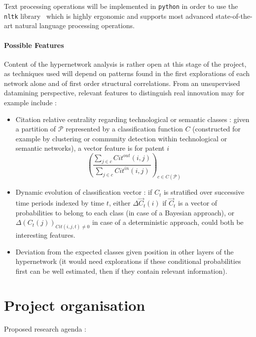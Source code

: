 Text processing operations will be implemented in \texttt{python} in order to use the \texttt{nltk} library~\cite{nltk} which is highly ergonomic and supports most advanced state-of-the-art natural language processing operations.


\paragraph{Possible Features}

Content of the hypernetwork analysis is rather open at this stage of the project, as techniques used will depend on patterns found in the first explorations of each network alone and of first order structural correlations. From an unsupervised datamining perspective, relevant features to distinguish real innovation may for example include :
\begin{itemize}
\item Citation relative centrality regarding technological or semantic classes : given a partition of $\mathcal{P}$ represented by a classification function $C$ (constructed for example by clustering or community detection within technological or semantic networks), a vector feature is for patent $i$
\[
\left(\frac{\sum_{j\in c}Cit^{out}(i,j)}{\sum_{j\in c}Cit^{in}(i,j)}\right)_{c\in C(\mathcal{P})}
\]
\item Dynamic evolution of classification vector : if $C_t$ is stratified over successive time periods indexed by time $t$, either $\Delta \vec{C}_t (i)$ if $\vec{C}_t$ is a vector of probabilities to belong to each class (in case of a Bayesian approach), or $\Delta (C_t(j))_{Cit(i,j,t)\neq 0}$ in case of a deterministic approach, could both be interesting features.
\item Deviation from the expected classes given position in other layers of the hypernetwork (it would need explorations if these conditional probabilities first can be well estimated, then if they contain relevant information).
\end{itemize}

 



\section{Project organisation}

Proposed research agenda :

